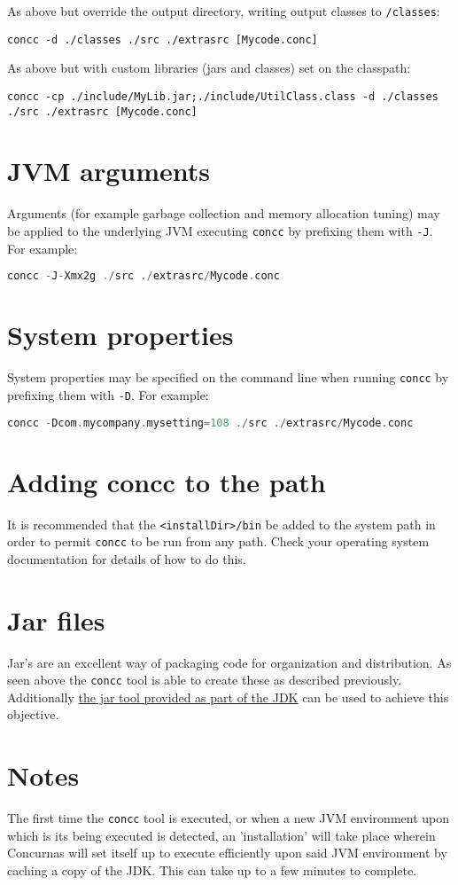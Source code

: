 \documentclass[conc-doc]{subfiles}
\begin{document}
As above but override the output directory, writing output classes to \lstinline{/classes}:
\begin{lstlisting}
concc -d ./classes ./src ./extrasrc [Mycode.conc]
\end{lstlisting}

As above but with custom libraries (jars and classes) set on the classpath:
\begin{lstlisting}
concc -cp ./include/MyLib.jar;./include/UtilClass.class -d ./classes ./src ./extrasrc [Mycode.conc]
\end{lstlisting}

\section{JVM arguments}
Arguments (for example garbage collection and memory allocation tuning) may be applied to the underlying JVM executing \lstinline{concc} by prefixing them with \lstinline{-J}. For example:

\begin{lstlisting}[language=C]
concc -J-Xmx2g ./src ./extrasrc/Mycode.conc
\end{lstlisting}

\section{System properties}
System properties may be specified on the command line when running \lstinline{concc} by prefixing them with \lstinline{-D}. For example:

\begin{lstlisting}[language=C]
concc -Dcom.mycompany.mysetting=108 ./src ./extrasrc/Mycode.conc
\end{lstlisting}

\section{Adding concc to the path}
It is recommended that the \lstinline{<installDir>/bin} be added to the system path in order to permit \lstinline{concc} to be run from any path. Check your operating system documentation for details of how to do this.

\section{Jar files}
Jar's are an excellent way of packaging code for organization and distribution. As seen above the \lstinline{concc} tool is able to create these as described previously. Additionally \href{https://docs.oracle.com/javase/tutorial/deployment/jar/build.html}{the jar tool provided as part of the JDK} can be used to achieve this objective.

\section{Notes}
The first time the \lstinline{concc} tool is executed, or when a new JVM environment upon which is its being executed is detected, an 'installation' will take place wherein Concurnas will set itself up to execute efficiently upon said JVM environment by caching a copy of the JDK. This can take up to a few minutes to complete.
\end{document}
